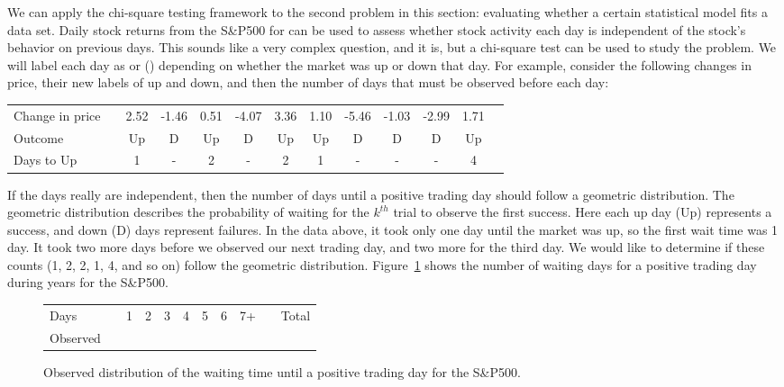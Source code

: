 We can apply the chi-square testing framework to the
second problem in this section:
evaluating whether a certain statistical model fits
a data set.
Daily stock returns from the S\&P500 for \spyears{} can be used to assess whether stock activity each day is independent of the stock's behavior on previous days. This sounds like a very complex question, and it is, but a chi-square test can be used to study the problem. We will label each day as  or  () depending on whether the market was up or down that day. For example, consider the following changes in price, their new labels of up and down, and then the number of days that must be observed before each  day:
\begin{center}\footnotesize
\begin{tabular}{lc ccc ccc ccc cc}
Change in price		&\hspace{-1mm}	& \footnotesize2.52 &
	\footnotesize-1.46 & \footnotesize 0.51 &
	\footnotesize-4.07 & \footnotesize3.36 &
	\footnotesize1.10 &
	\footnotesize-5.46 & \footnotesize-1.03 & \footnotesize-2.99 & \footnotesize1.71 \\
Outcome	 & \hspace{-1mm} &
	Up &
	D & Up &
	D & Up &
	Up &
	D & D & D & Up \\
\footnotesize Days to Up & \hspace{-1mm} & 1 & - & 2 & - & 2 & 1 & - & - & - & 4 \\
\end{tabular}
\end{center}
If the days really are independent, then the number of days until a positive trading day should follow a geometric distribution. The geometric distribution describes the probability of waiting for the $k^{th}$ trial to observe the first success. Here each up day (Up) represents a success, and down (D) days represent failures. In the data above, it took only one day until the market was up, so the first wait time was 1 day. It took two more days before we observed our next  trading day, and two more for the third  day. We would like to determine if these counts (1, 2, 2, 1, 4, and so on) follow the geometric distribution. Figure~\ref{sAndP500TimeToPosTrade} shows the number of waiting days for a positive trading day during \spyears{} years for the S\&P500.

\begin{figure}[h]
\centering
\begin{tabular}{ll ccc ccc c ll}
  \hline
  Days	 & \hspace{2mm} & 1 & 2 & 3 & 4 & 5 & 6 & 7+ &
      \hspace{2mm} & Total \\
  Observed &		& \spdaysA{} & \spdaysB{} & \spdaysC{} &
      \spdaysD{} & \spdaysE{} & \spdaysF{} & \spdaysG{} & &
      \spdays{} \\
  \hline
\end{tabular}
\caption{Observed distribution of the waiting time until
    a positive trading day for the S\&P500.}
\label{sAndP500TimeToPosTrade}
\end{figure}

